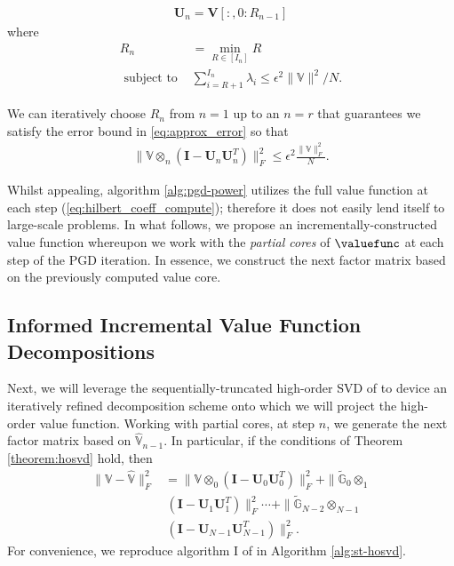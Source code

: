 %
\begin{align}
	\mathbf{U}_n = \mathbf{V}\left[:,0:R_{n-1}\right]  
\end{align}
%
where  
%
\begin{align}
	R_n &= \min_{R \in \left[ I_n \right]} R \nonumber \\
	\text{ subject to } &\sum_{i=R+1}^{I_n} \lambda_i \le \epsilon^2 \|\mathds{V}\|^2/N.
\end{align}

We can iteratively choose $R_n$ from $n=1$ up to an $n=r$ that guarantees we satisfy the error bound in  \eqref{eq:approx_error} so that
%
\begin{align}
	\| \mathds{V} \otimes_{n} \left(\mathbf{I} - \mathbf{U}_n \mathbf{U}_n^T\right) \|_F^2 \le \epsilon^2 \frac{ \| \mathds{V}\|_F^2}{N}.
\end{align}
%


Whilst appealing, algorithm \ref{alg:pgd-power} utilizes the full value function at each step (\cf \eqref{eq:hilbert_coeff_compute}); therefore it does not easily lend itself to large-scale problems. In what follows, we propose an incrementally-constructed value function whereupon we work with the \textit{partial cores} of $\valuefunc$ at each step of the PGD iteration. In essence, we construct the next factor matrix based on the previously computed value core. 


\subsection{Informed Incremental Value Function Decompositions}
\label{subsec:inc_hosvd}

Next, we will leverage the sequentially-truncated high-order SVD of \cite{VannieuwenhovenTruncate2012} to device an iteratively refined decomposition scheme onto which we will project the high-order value function. Working with partial cores, at step $n$, we generate the next factor matrix based on $\mathds{\hat{V}}_{n-1}$. In particular, if the conditions of Theorem \ref{theorem:hosvd} hold, then
%
\begin{align}
	\|\mathds{V} - \mathds{\hat{V}}\|_F^2 &=  \| \mathds{V} \otimes_0 \left( \mathbf{I} - \mathbf{U}_0 \mathbf{U}_0^T \right)\|_F^2 +  \| \mathds{\tilde{G}}_0 \otimes_1   \nonumber \\
	& \, \left( \mathbf{I} - \mathbf{U}_1 \mathbf{U}_1^T \right)\|_F^2 \cdots  + \| \mathds{\tilde{G}}_{N-2} \otimes_{N-1} \nonumber \\
	& \, \left( \mathbf{I} - \mathbf{U}_{N-1} \mathbf{U}_{N-1}^T \right)\|_F^2.
\end{align}
%
For convenience, we reproduce algorithm I of \cite{VannieuwenhovenTruncate2012} in Algorithm \ref{alg:st-hosvd}.

